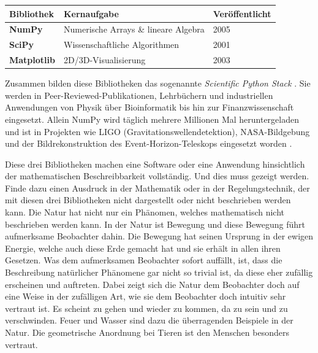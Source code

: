 \documentclass[12pt, a4paper]{article}
\begin{document}
\begin{center}
\begin{tabular}{lll}
  \toprule
  \textbf{Bibliothek} & \textbf{Kernaufgabe} & \textbf{Veröffentlicht} \\
  \midrule
  \textcolor{numpyblue}{\textbf{NumPy}} & Numerische Arrays \& lineare Algebra & 2005 \\
  \textcolor{scipygreen}{\textbf{SciPy}} & Wissenschaftliche Algorithmen & 2001 \\
  \textcolor{mplred}{\textbf{Matplotlib}} & 2D/3D-Visualisierung & 2003 \\
  \bottomrule
\end{tabular}
\end{center}

\vspace{0.5em}
Zusammen bilden diese Bibliotheken das sogenannte \emph{Scientific Python
Stack} \cite{virtanen2020scipy, harris2020array, hunter2007matplotlib}.
Sie werden in Peer-Reviewed-Publikationen, Lehrbüchern und industriellen
Anwendungen von Physik über Bioinformatik bis hin zur Finanzwissenschaft
eingesetzt. Allein NumPy wird täglich mehrere Millionen Mal heruntergeladen
und ist in Projekten wie LIGO (Gravitationswellendetektion), NASA-Bildgebung
und der Bildrekonstruktion des Event-Horizon-Teleskops eingesetzt worden
\cite{harris2020array}.

Diese drei Bibliotheken machen eine Software oder eine Anwendung hinsichtlich der mathematischen Beschreibbarkeit vollständig. Und dies muss gezeigt werden. Finde dazu einen Ausdruck in der Mathematik oder in der Regelungstechnik, der mit diesen drei Bibliotheken nicht dargestellt oder nicht beschrieben werden kann. Die Natur hat nicht nur ein Phänomen, welches mathematisch nicht beschrieben werden kann. In der Natur ist Bewegung und diese Bewegung führt aufmerksame Beobachter dahin. Die Bewegung hat seinen Ursprung in der ewigen Energie, welche auch diese Erde gemacht hat und sie erhält in allen ihren Gesetzen. Was dem aufmerksamen Beobachter sofort auffällt, ist, dass die Beschreibung natürlicher Phänomene gar nicht so trivial ist, da diese eher zufällig erscheinen und auftreten. Dabei zeigt sich die Natur dem Beobachter doch auf eine Weise in der zufälligen Art, wie sie dem Beobachter doch intuitiv sehr vertraut ist. Es scheint zu gehen und wieder zu kommen, da zu sein und zu verschwinden. Feuer und Wasser sind dazu die überragenden Beispiele in der Natur. Die geometrische Anordnung bei Tieren ist den Menschen besonders vertraut.
\end{document}
